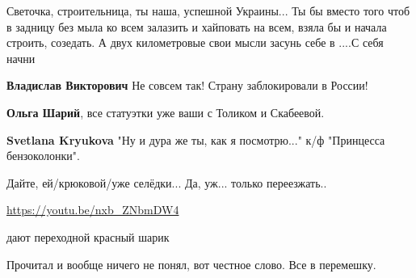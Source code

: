 \begin{itemize}
\begin{itemize}
Светочка, строительница, ты наша, успешной Украины... Ты бы вместо того чтоб в
задницу без мыла ко всем залазить и хайповать на всем, взяла бы и начала
строить, созедать. А двух километровые свои мысли засунь себе в ....С себя
начни

 
\textbf{Владислав Викторович} Не совсем так! Страну заблокировали в России!

 
\textbf{Ольга Шарий}, все статуэтки уже ваши с Толиком и Скабеевой.

 
\textbf{Svetlana Kryukova} "Ну и дура же ты, как я посмотрю..." к/ф "Принцесса бензоколонки".

 

Дайте, ей/крюковой/уже селёдки...
Да, уж... только переезжать..

\url{https://youtu.be/nxb_ZNbmDW4}

 
дают переходной красный шарик

 
Прочитал и вообще ничего не понял, вот честное слово. Все в перемешку.


\end{itemize}
\end{itemize}
